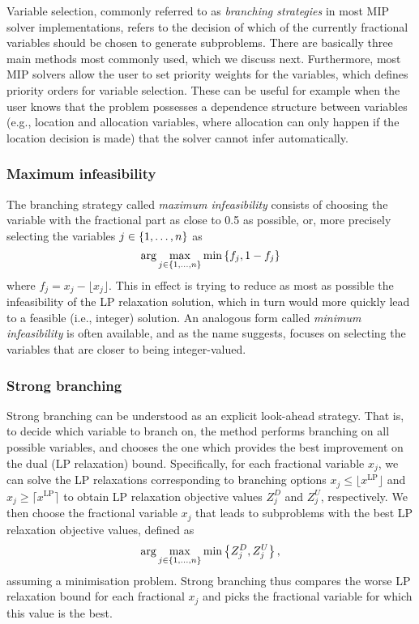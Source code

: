 Variable selection, commonly referred to as \emph{branching strategies} in most MIP solver implementations, refers to the decision of which of the currently fractional variables should be chosen to generate subproblems. There are basically three main methods most commonly used, which we discuss next. Furthermore, most MIP solvers allow the user to set priority weights for the variables, which defines priority orders for variable selection. These can be useful for example when the user knows that the problem possesses a dependence structure between variables (e.g., location and allocation variables, where allocation can only happen if the location decision is made) that the solver cannot infer automatically. 


\subsubsection{Maximum infeasibility}

The branching strategy called \emph{maximum infeasibility} consists of choosing the variable with the fractional part as close to 0.5 as possible, or, more precisely selecting the variables $j \in \left\{ 1, \dots, n \right \}$ as
%
\begin{equation*}
	\arg\max_{j \in \left\{ 1,\dots,n \right \}} \min\left\{ f_j, 1 - f_j \right \} 	
\end{equation*}
%
where $f_j = x_j - \lfloor x_j \rfloor$. This in effect is trying to reduce as most as possible the infeasibility of the LP relaxation solution, which in turn would more quickly lead to a feasible (i.e., integer) solution. An analogous form called \emph{minimum infeasibility} is often available, and as the name suggests, focuses on selecting the variables that are closer to being integer-valued.

\subsubsection{Strong branching}

Strong branching can be understood as an explicit look-ahead strategy. That is, to decide which variable to branch on, the method performs branching on all possible variables, and chooses the one which provides the best improvement on the dual (LP relaxation) bound. Specifically, for each fractional variable $x_j$, we can solve the LP relaxations corresponding to branching options $x_j \leq \lfloor x^\text{LP} \rfloor$ and $x_j \geq \lceil x^\text{LP} \rceil$ to obtain LP relaxation objective values $Z_j^D$ and $Z_j^U$, respectively. We then choose the fractional variable $x_j$ that leads to subproblems with the best LP relaxation objective values, defined as 
%
\begin{equation*}
	\arg\max_{j \in \left\{ 1,\dots,n \right \}} \min\left\{ Z_j^D, Z_j^U \right \}, 	
\end{equation*}
% 
assuming a minimisation problem. Strong branching thus compares the worse LP relaxation bound for each fractional $x_j$ and picks the fractional variable for which this value is the best. 

